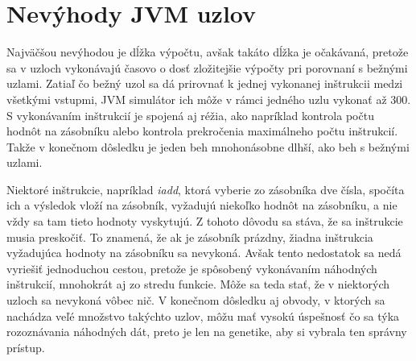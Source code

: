 \section{Nevýhody JVM uzlov}
\label{sec:disadvantages}

Najväčšou nevýhodou je dĺžka výpočtu, avšak takáto dĺžka je očakávaná, pretože sa v uzloch vykonávajú časovo o dosť zložitejšie výpočty pri porovnaní s bežnými uzlami. Zatiaľ čo bežný uzol sa dá prirovnať k jednej vykonanej inštrukcii medzi všetkými vstupmi, JVM simulátor ich môže v rámci jedného uzlu vykonať až 300. S vykonávaním inštrukcií je spojená aj réžia, ako napríklad kontrola počtu hodnôt na zásobníku alebo kontrola prekročenia maximálneho počtu inštrukcií. Takže v konečnom dôsledku je jeden beh mnohonásobne dlhší, ako beh s bežnými uzlami.

Niektoré inštrukcie, napríklad \textit{iadd}, ktorá vyberie zo zásobníka dve čísla, spočíta ich a výsledok vloží na zásobník, vyžadujú niekoľko hodnôt na zásobníku, a nie vždy sa tam tieto hodnoty vyskytujú. Z tohoto dôvodu sa stáva, že sa inštrukcie musia preskočiť. To znamená, že ak je zásobník prázdny, žiadna inštrukcia vyžadujúca hodnoty na zásobníku sa nevykoná. Avšak tento nedostatok sa nedá vyriešiť jednoduchou cestou, pretože je spôsobený vykonávaním náhodných inštrukcií, mnohokrát aj zo stredu funkcie. Môže sa teda stať, že v niektorých uzloch sa nevykoná vôbec nič. V konečnom dôsledku aj obvody, v ktorých sa nachádza veľé množstvo takýchto uzlov, môžu mať vysokú úspešnosť čo sa týka rozoznávania náhodných dát, preto je len na genetike, aby si vybrala ten správny prístup. 
